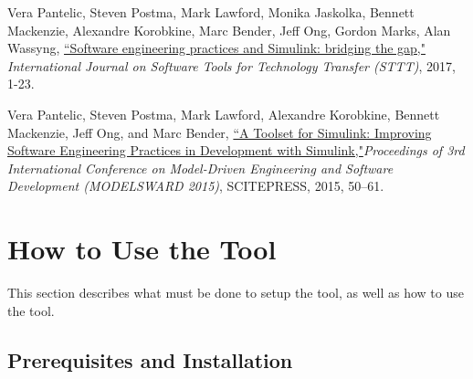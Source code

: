 \documentclass{article}
\begin{document}
\vspace{1em}
Vera Pantelic, Steven Postma, Mark Lawford, Monika Jaskolka, Bennett Mackenzie, Alexandre Korobkine, Marc Bender, Jeff Ong, Gordon Marks, Alan Wassyng, \href{https://link.springer.com/article/10.1007/s10009-017-0450-9}{``Software engineering practices and Simulink: bridging the gap,"} \textit{International Journal on Software Tools for Technology Transfer (STTT)}, 2017, 1-23.

\vspace{1em}
Vera Pantelic, Steven Postma, Mark Lawford, Alexandre Korobkine, Bennett Mackenzie, Jeff Ong, and Marc Bender, \href{http://www.cas.mcmaster.ca/~lawford/papers/MODELSWARD2015.pdf}{``A Toolset for Simulink: Improving Software Engineering Practices in Development with Simulink,"}\textit{Proceedings of 3rd International Conference on Model-Driven Engineering and Software Development (MODELSWARD 2015)}, SCITEPRESS, 2015, 50--61.

\newpage	
\section{How to Use the Tool}
This section describes what must be done to setup the tool, as well as how to use the tool.

\subsection{Prerequisites and Installation}
\end{document}
